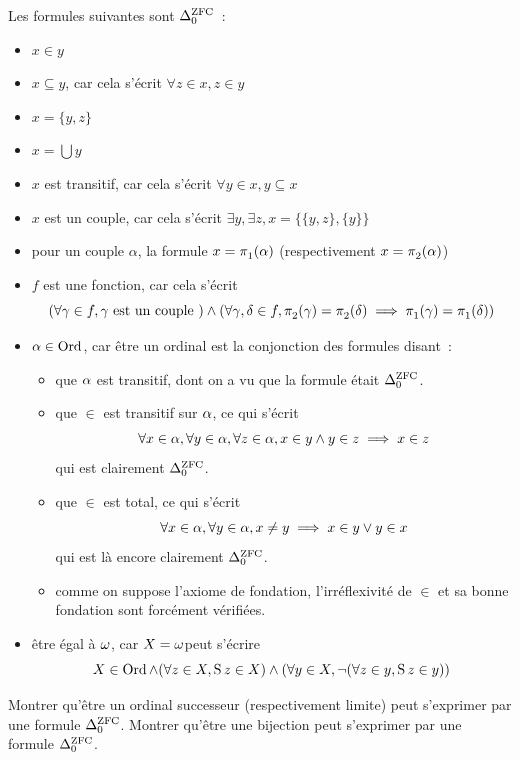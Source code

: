 \begin{example}
  Les formules suivantes sont $\Delta_{0}^{\operatorname{ZFC}}$~:
  \begin{itemize}
  \item $x\in y$
  \item $x\subseteq y$, car cela s'écrit $\forall z \in x, z \in y$
  \item $x = \{y,z\}$
  \item $x = \bigcup y$
  \item $x$ est transitif, car cela s'écrit $\forall y \in x, y\subseteq x$
  \item $x$ est un couple, car cela s'écrit
    $\exists y,\exists z, x = \{\{y,z\},\{y\}\}$
  \item pour un couple $\alpha$, la formule $x = \mathop{\pi_{1}^{}}(\alpha)$
    (respectivement $x = \mathop{\pi_{2}^{}}(\alpha)$)
  \item $f$ est une fonction, car cela s'écrit
    \[\left(\forall \gamma \in f, \gamma\text{ est un couple }\right)\land
    \left(\forall \gamma,\delta \in f, \mathop{\pi_{2}^{}}(\gamma) = \mathop{\pi_{2}^{}}(\delta)
    \implies \mathop{\pi_{1}^{}}(\gamma) = \mathop{\pi_{1}^{}}(\delta)\right) \]
  \item $\alpha \in \operatorname{Ord}$, car être un ordinal est la conjonction des formules
    disant~:
    \begin{itemize}
    \item que $\alpha$ est transitif, dont on a vu que la formule était
      $\Delta_{0}^{\operatorname{ZFC}}$.
    \item que $\in$ est transitif sur $\alpha$, ce qui s'écrit
      \[\forall x \in \alpha, \forall y \in \alpha, \forall z \in \alpha,
      x\in y \land y \in z \implies x \in z\] qui est clairement $\Delta_{0}^{\operatorname{ZFC}}$.
    \item que $\in$ est total, ce qui s'écrit
      \[\forall x \in \alpha, \forall y \in \alpha, x \neq y \implies
      x \in y \lor y \in x\] qui est là encore clairement $\Delta_{0}^{\operatorname{ZFC}}$.
    \item comme on suppose l'axiome de fondation, l'irréflexivité de $\in$ et sa
      bonne fondation sont forcément vérifiées.
    \end{itemize}
  \item être égal à $\omega$, car \og $X = \omega$\fg peut s'écrire
    \[X\in \operatorname{Ord} \land (\forall z \in X, \operatorname{S} z \in X) \land
    (\forall y \in X, \lnot (\forall z \in y, \operatorname{S} z \in y))\]
  \end{itemize}
\end{example}

\begin{exercise}
  Montrer qu'être un ordinal successeur (respectivement limite) peut s'exprimer
  par une formule $\Delta_{0}^{\operatorname{ZFC}}$. Montrer qu'être une bijection peut s'exprimer
  par une formule $\Delta_{0}^{\operatorname{ZFC}}$.
\end{exercise}

